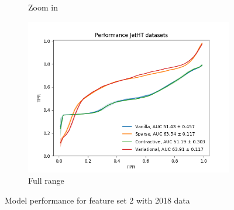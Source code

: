 \begin{figure}[h!]
\begin{subfigure}[b]{0.49\linewidth}
        \caption{Zoom in}
    \end{subfigure}
    \begin{subfigure}[b]{0.49\linewidth}
        \includegraphics[width=\linewidth]{images/reco/2018/feature_2/performance_JetHT_VanillaSparseContractiveVariational.png}
        \caption{Full range}
    \end{subfigure}
    \caption{Model performance for feature set 2 with 2018 data}
\label{fig:2018_f2_ae_performance}
\end{figure}

